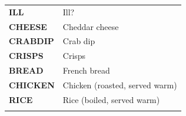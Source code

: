 \documentclass[12pt,a4paper]{book}
\theoremstyle{definition}
\theoremstyle{definition}
\theoremstyle{definition}
\theoremstyle{remark}
\begin{document}
\begin{longtable}[]{@{}ll@{}}
\toprule
\endhead
\begin{minipage}[t]{0.21\columnwidth}\raggedright
\textbf{ILL}\strut
\end{minipage} & \begin{minipage}[t]{0.44\columnwidth}\raggedright
Ill?\strut
\end{minipage}\tabularnewline
\begin{minipage}[t]{0.21\columnwidth}\raggedright
\textbf{CHEESE}\strut
\end{minipage} & \begin{minipage}[t]{0.44\columnwidth}\raggedright
Cheddar cheese\strut
\end{minipage}\tabularnewline
\begin{minipage}[t]{0.21\columnwidth}\raggedright
\textbf{CRABDIP}\strut
\end{minipage} & \begin{minipage}[t]{0.44\columnwidth}\raggedright
Crab dip\strut
\end{minipage}\tabularnewline
\begin{minipage}[t]{0.21\columnwidth}\raggedright
\textbf{CRISPS}\strut
\end{minipage} & \begin{minipage}[t]{0.44\columnwidth}\raggedright
Crisps\strut
\end{minipage}\tabularnewline
\begin{minipage}[t]{0.21\columnwidth}\raggedright
\textbf{BREAD}\strut
\end{minipage} & \begin{minipage}[t]{0.44\columnwidth}\raggedright
French bread\strut
\end{minipage}\tabularnewline
\begin{minipage}[t]{0.21\columnwidth}\raggedright
\textbf{CHICKEN}\strut
\end{minipage} & \begin{minipage}[t]{0.44\columnwidth}\raggedright
Chicken (roasted, served warm)\strut
\end{minipage}\tabularnewline
\begin{minipage}[t]{0.21\columnwidth}\raggedright
\textbf{RICE}\strut
\end{minipage} & \begin{minipage}[t]{0.44\columnwidth}\raggedright
Rice (boiled, served warm)\strut
\end{minipage}\tabularnewline
\begin{minipage}[t]{0.21\columnwidth}\raggedright

\end{minipage}
\end{longtable}
\end{document}
